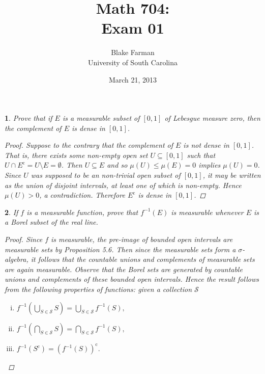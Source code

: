 \documentclass[12pt]{amsart}
\author{Blake Farman\\University of South Carolina}
\title{Math 704:\\Exam 01}
\date{March 21, 2013}
\begin{document}
\maketitle

\providecommand{\p}{\mathfrak{p}}
\providecommand{\m}{\mathfrak{m}}

\newtheorem{thm}{}
\newtheorem{lem}{Lemma}

\setcounter{thm}{5}

\begin{thm}
  Prove that if $E$ is a measurable subset of $[0,1]$ of Lebesgue measure zero, then the complement of $E$ is dense in $[0,1]$.

  \begin{proof}
    Suppose to the contrary that the complement of $E$ is not dense in $[0,1]$.
    That is, there exists some non-empty open set $U \subseteq [0,1]$ such that $U \cap E^\text{c} = U \setminus E = \emptyset$.
    Then $U \subseteq E$ and so $\mu(U) \leq \mu(E) = 0$ implies $\mu(U) = 0$.
    Since $U$ was supposed to be an non-trivial open subset of $[0,1]$, it may be written as the union of disjoint intervals, at least one of which is non-empty.
    Hence $\mu(U) > 0$, a contradiction.
    Therefore $E^\text{c}$ is dense in $[0,1]$.
  \end{proof}
\end{thm}
\newpage

\setcounter{thm}{7}

\begin{thm}
  If $f$ is a measurable function, prove that $f^{-1}(E)$ is measurable whenever $E$ is a Borel subset of the real line.
  
  \begin{proof}
    Since $f$ is measurable, the pre-image of bounded open intervals are measurable sets by Proposition 5.6.
    Then since the measurable sets form a $\sigma$-algebra, it follows that the countable unions and complements of measurable sets are again measurable.
    Observe that the Borel sets are generated by countable unions and complements of these bounded open intervals.
    Hence the result follows from the following properties of functions: given a collection $\mathcal{S}$
    \begin{enumerate}[(i)]
      \item
        $f^{-1}\left(\bigcup_{S \in \mathcal{S}} S\right) = \bigcup_{S \in \mathcal{S}} f^{-1}(S),$
      \item
        $f^{-1}\left(\bigcap_{S \in \mathcal{S}} S\right) = \bigcap_{S \in \mathcal{S}} f^{-1}(S),$  
      \item
        $f^{-1}(S^\text{c}) = (f^{-1}(S))^\text{c}.$
    \end{enumerate}
  \end{proof}
\end{thm}
\newpage
\end{document}
